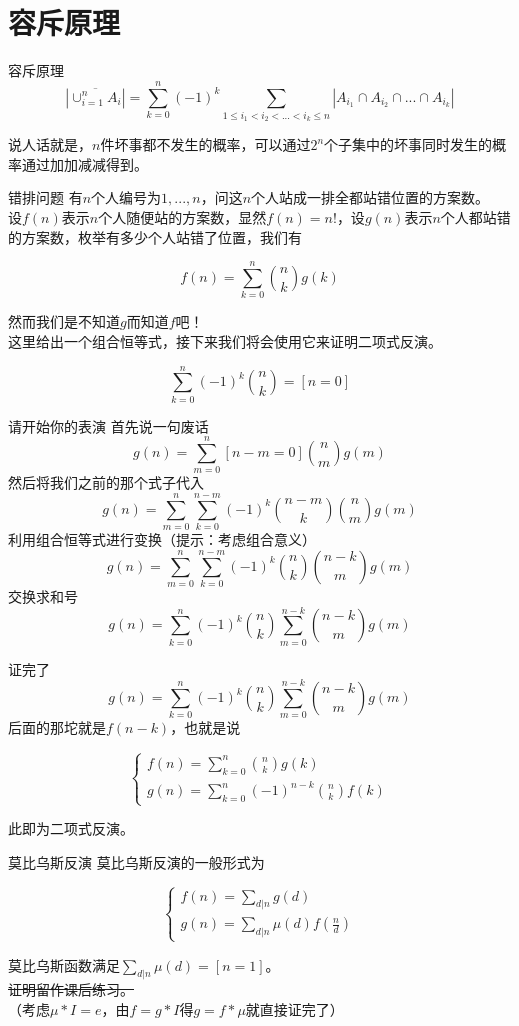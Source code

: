 \documentclass{beamer}
\begin{document}
	\section{容斥原理}
	\begin{frame}{容斥原理}
		$$|\overline{\cup_{i=1}^nA_i}|=\sum_{k=0}^n(-1)^k\sum_{1 \le i_1 < i_2<...<i_k \le n}|A_{i_1}\cap A_{i_2}\cap ... \cap A_{i_k}|$$
		
		说人话就是，$n$件坏事都不发生的概率，可以通过$2^n$个子集中的坏事同时发生的概率通过加加减减得到。
	\end{frame}
	\begin{frame}{错排问题}
		有$n$个人编号为$1,...,n$，问这$n$个人站成一排全都站错位置的方案数。
		\pause\\
		
		设$f(n)$表示$n$个人随便站的方案数，显然$f(n)=n!$，设$g(n)$表示$n$个人都站错的方案数，枚举有多少个人站错了位置，我们有
		
		$$f(n)=\sum_{k=0}^n\binom{n}{k}g(k)$$
		
		然而我们是不知道$g$而知道$f$吧！
		\pause\\
		
		这里给出一个组合恒等式，接下来我们将会使用它来证明二项式反演。
		
		$$\sum_{k=0}^n(-1)^k\binom{n}{k}=[n=0]$$
		
		
	\end{frame}
	\begin{frame}{请开始你的表演}
		\pause
		首先说一句废话
		$$g(n)=\sum_{m=0}^n[n-m=0]\binom{n}{m}g(m)$$
		\pause
		然后将我们之前的那个式子代入
		$$g(n)=\sum_{m=0}^n\sum_{k=0}^{n-m}(-1)^k\binom{n-m}{k}\binom{n}{m}g(m)$$
		\pause
		利用组合恒等式进行变换（提示：考虑组合意义）
		$$g(n)=\sum_{m=0}^n\sum_{k=0}^{n-m}(-1)^k\binom{n}{k}\binom{n-k}{m}g(m)$$
		\pause
		交换求和号
		$$g(n)=\sum_{k=0}^n(-1)^k\binom{n}{k}\sum_{m=0}^{n-k}\binom{n-k}{m}g(m)$$
	\end{frame}
	\begin{frame}{证完了}
		$$g(n)=\sum_{k=0}^n(-1)^k\binom{n}{k}\sum_{m=0}^{n-k}\binom{n-k}{m}g(m)$$
		\pause
		后面的那坨就是$f(n-k)$，也就是说
		
		$$\begin{cases}
		f(n)=\sum_{k=0}^n\binom{n}{k}g(k)\\
		g(n)=\sum_{k=0}^n(-1)^{n-k}\binom{n}{k}f(k)
		\end{cases}$$
		
		此即为二项式反演。
		
	\end{frame}
	\begin{frame}{莫比乌斯反演}
		莫比乌斯反演的一般形式为
		
		$$\begin{cases}
		f(n)=\sum_{d|n}g(d)\\
		g(n)=\sum_{d|n}\mu(d)f(\frac{n}{d})
		\end{cases}$$
		
		莫比乌斯函数满足$\sum_{d|n}\mu(d)=[n=1]$。
		\pause\\
		
		\sout{证明留作课后练习。}
		\pause\\
		
		（考虑$\mu*I=e$，由$f=g*I$得$g=f*\mu$就直接证完了）
	\end{frame}
\end{document}
